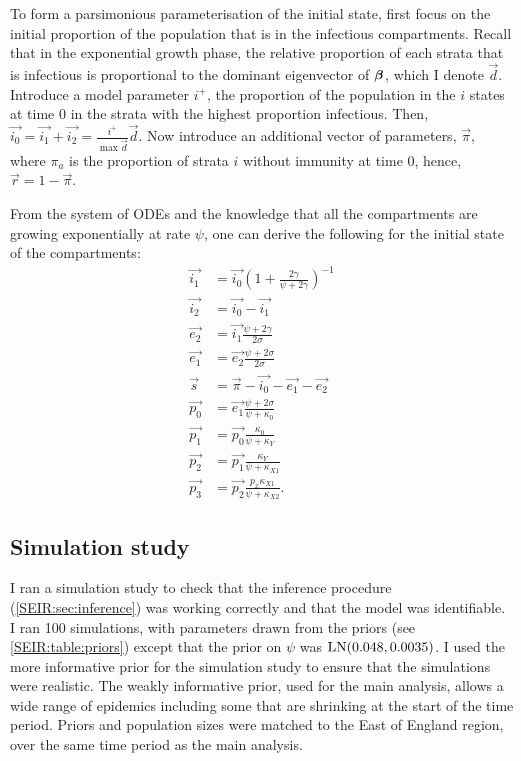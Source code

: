 \documentclass[thesis.tex]{subfiles}
\begin{document}
To form a parsimonious parameterisation of the initial state, first focus on the initial proportion of the population that is in the infectious compartments.
Recall that in the exponential growth phase, the relative proportion of each strata that is infectious is proportional to the dominant eigenvector of $\bm{\beta}$, which I denote $\vec{d}$.
Introduce a model parameter $i^+$, the proportion of the population in the $i$ states at time 0 in the strata with the highest proportion infectious.
Then, $\vec{i_0} = \vec{i_1} + \vec{i_2} = \frac{i^+}{\max \vec{d}} \vec{d}$.
Now introduce an additional vector of parameters, $\vec{\pi}$, where $\pi_a$ is the proportion of strata $i$ without immunity at time 0, hence, $\vec{r} = 1 - \vec{\pi}$.

From the system of ODEs and the knowledge that all the compartments are growing exponentially at rate $\psi$, one can derive the following for the initial state of the compartments:
\begin{align}
    \vec{i_1} &= \vec{i_0} \left(1 + \frac{2\gamma}{\psi + 2\gamma} \right)^{-1} \\
    \vec{i_2} &= \vec{i_0} - \vec{i_1} \\
    \vec{e_2} &= \vec{i_1} \frac{\psi + 2\gamma}{2\sigma} \\
    \vec{e_1} &= \vec{e_2} \frac{\psi + 2\sigma}{2\sigma} \\
    \vec{s} &= \vec{\pi} - \vec{i_0} - \vec{e_1} - \vec{e_2} \\
    \vec{p_0} &= \vec{e_1} \frac{\psi + 2\sigma}{\psi + \kappa_0} \\
    \vec{p_1} &= \vec{p_0} \frac{\kappa_0}{\psi + \kappa_Y} \\
    \vec{p_2} &= \vec{p_1} \frac{\kappa_Y}{\psi + \kappa_{X1}} \\
    \vec{p_3} &= \vec{p_2} \frac{p_x \kappa_{X1}}{\psi + \kappa_{X2}}.
\end{align}

\subsection{Simulation study} \label{SEIR:sec:sim-study}

I ran a simulation study to check that the inference procedure (\cref{SEIR:sec:inference}) was working correctly and that the model was identifiable.
I ran 100 simulations, with parameters drawn from the priors (see \cref{SEIR:table:priors}) except that the prior on $\psi$ was $\operatorname{LN}(0.048, 0.0035)$.
I used the more informative prior for the simulation study to ensure that the simulations were realistic.
The weakly informative prior, used for the main analysis, allows a wide range of epidemics including some that are shrinking at the start of the time period.
Priors and population sizes were matched to the East of England region, over the same time period as the main analysis.
\end{document}
